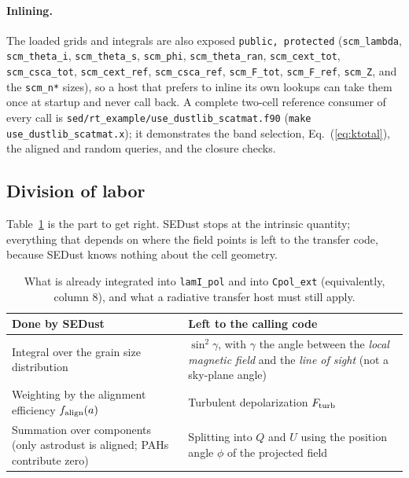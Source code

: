 \documentclass{my_memo}
\newcommand{\code}[1]{\texttt{#1}}
\begin{document}
\paragraph{Inlining.} The loaded grids and integrals are also exposed
\code{public, protected} (\code{scm\_lambda}, \code{scm\_theta\_i},
\code{scm\_theta\_s}, \code{scm\_phi}, \code{scm\_theta\_ran}, \code{scm\_cext\_tot},
\code{scm\_csca\_tot}, \code{scm\_cext\_ref}, \code{scm\_csca\_ref},
\code{scm\_F\_tot}, \code{scm\_F\_ref}, \code{scm\_Z}, and the \code{scm\_n*}
sizes), so a host that prefers to inline its own lookups can take them once at
startup and never call back. A complete two-cell reference consumer of every call
is \code{sed/rt\_example/use\_dustlib\_scatmat.f90} (\code{make
use\_dustlib\_scatmat.x}); it demonstrates the band selection,
Eq.~(\ref{eq:ktotal}), the aligned and random queries, and the closure checks.

\subsection{Division of labor}\label{sec:pol:division}

Table~\ref{tab:poldivision} is the part to get right. SEDust stops at the
intrinsic quantity; everything that depends on where the field points is left
to the transfer code, because SEDust knows nothing about the cell geometry.

\begin{table}[h]
\centering
\begin{tabular}{@{}p{}p{}@{}}
\toprule
Done by SEDust & Left to the calling code \\
\midrule
Integral over the grain size distribution &
$\sin^2\gamma$, with $\gamma$ the angle between the \emph{local magnetic
field} and the \emph{line of sight} (not a sky-plane angle) \\[2pt]
Weighting by the alignment efficiency $f_{\rm align}(a)$ &
Turbulent depolarization $F_{\rm turb}$ \\[2pt]
Summation over components (only astrodust is aligned; PAHs contribute zero) &
Splitting into $Q$ and $U$ using the position angle $\phi$ of the projected
field \\
\bottomrule
\end{tabular}
\caption{What is already integrated into \code{lamI\_pol} and into
\code{Cpol\_ext} (equivalently, column 8), and what a radiative transfer host
must still apply.}
\label{tab:poldivision}
\end{table}
\end{document}
